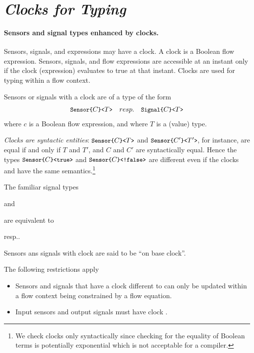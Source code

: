 {\section{\textit{Clocks for Typing}}\label{flow-types} 

\paragraph{Sensors and signal types enhanced by clocks.}
Sensors, signals, and expressions may have a clock. A clock is a Boolean flow expression. Sensors, signals, and flow expressions are accessible at an instant only if the clock (expression) evaluates to true at that instant. Clocks are used for typing within a flow context.

 Sensors or signals with a clock are of a type of the form
$$\texttt{\small{Sensor\{}}C\texttt{\small{\}<}}T\texttt{\small{>}} \quad resp. \quad \texttt{\small{Signal\{}}C\texttt{\small{\}<}}T\texttt{\small{>}}
$$
where $c$ is a Boolean flow expression, and where $T$ is a (value) type.

\emph{Clocks are syntactic entities}: $\texttt{\small{Sensor\{}}C\texttt{\small{\}<}}T\texttt{\small{>}}$  and $\texttt{\small{Sensor\{}}C'\texttt{\small{\}<}}T'\texttt{\small{>}}$, for instance, are equal if and only
if $T$ and $T'$, and $C$ and $C'$ are syntactically equal. Hence the 
types $\texttt{\small{Sensor\{}}C\texttt{\small{\}<true>}}$ and $\texttt{\small{Sensor\{}}C\texttt{\small{\}<!false>}}$ are different even if the clocks \emph{} and \emph{} have the same semantics.\footnote{We check clocks only syntactically since checking for the equality of Boolean terms is potentially exponential which is not acceptable for a compiler.}

The familiar signal types 
\begin{center}
\emph{}\quad and\quad \emph{}
\end{center}
are equivalent to
\begin{center}
\emph{}\quad resp.\quad \emph{}.
\end{center}
Sensors ans signals with clock \emph{} are said to be ``on base clock''.

The following restrictions apply
\begin{itemize}
\item Sensors and signals that have a clock different to \emph{} can only be updated within a flow context being constrained by a flow equation. 

\item Input sensors and output signals must have clock \emph{}.


\end{itemize}}
